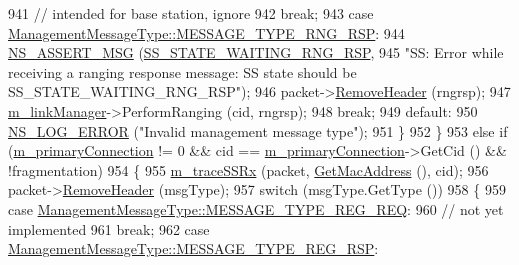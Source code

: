 \begin{DoxyCode}
941               \textcolor{comment}{// intended for base station, ignore}
942               \textcolor{keywordflow}{break};
943             \textcolor{keywordflow}{case} \hyperlink{classns3_1_1ManagementMessageType_a0e0c7a1e263538f0379d1bdb015abe3dacc6d687507c639e29ca78b926d6345e1}{ManagementMessageType::MESSAGE\_TYPE\_RNG\_RSP}:
944               \hyperlink{assert_8h_aff5ece9066c74e681e74999856f08539}{NS\_ASSERT\_MSG} (\hyperlink{classns3_1_1SubscriberStationNetDevice_af9f145bc05df1f18610a3d4b61ff9ee4acb68c803df0eb6a0f4cc41389f981db8}{SS\_STATE\_WAITING\_RNG\_RSP},
945                              \textcolor{stringliteral}{"SS: Error while receiving a ranging response message: SS state should be
       SS\_STATE\_WAITING\_RNG\_RSP"});
946               packet->\hyperlink{classns3_1_1Packet_a0961eccf975d75f902d40956c93ba63e}{RemoveHeader} (rngrsp);
947               \hyperlink{classns3_1_1SubscriberStationNetDevice_a24e7df59fb312c196318f0366b63c6e6}{m\_linkManager}->PerformRanging (cid, rngrsp);
948               \textcolor{keywordflow}{break};
949             \textcolor{keywordflow}{default}:
950               \hyperlink{group__logging_ga0261a8db1d4ac5f79417d117634fd455}{NS\_LOG\_ERROR} (\textcolor{stringliteral}{"Invalid management message type"});
951             \}
952         \}
953       \textcolor{keywordflow}{else} \textcolor{keywordflow}{if} (\hyperlink{classns3_1_1SubscriberStationNetDevice_a269b0f9be1f02abe86f5a08cf9def186}{m\_primaryConnection} != 0 && cid == 
      \hyperlink{classns3_1_1SubscriberStationNetDevice_a269b0f9be1f02abe86f5a08cf9def186}{m\_primaryConnection}->GetCid () && !fragmentation)
954         \{
955           \hyperlink{classns3_1_1SubscriberStationNetDevice_aa1771f784eeb694c5ad2035f97ee52e5}{m\_traceSSRx} (packet, \hyperlink{classns3_1_1WimaxNetDevice_aa02eb7f6de9c03f0b8f2e33e3c5b5559}{GetMacAddress} (), cid);
956           packet->\hyperlink{classns3_1_1Packet_a0961eccf975d75f902d40956c93ba63e}{RemoveHeader} (msgType);
957           \textcolor{keywordflow}{switch} (msgType.GetType ())
958             \{
959             \textcolor{keywordflow}{case} \hyperlink{classns3_1_1ManagementMessageType_a0e0c7a1e263538f0379d1bdb015abe3da828d55fda1b247a375efce7eec6f9539}{ManagementMessageType::MESSAGE\_TYPE\_REG\_REQ}:
960               \textcolor{comment}{// not yet implemented}
961               \textcolor{keywordflow}{break};
962             \textcolor{keywordflow}{case} \hyperlink{classns3_1_1ManagementMessageType_a0e0c7a1e263538f0379d1bdb015abe3da5579f363a6f117d318768de1f8e69e6f}{ManagementMessageType::MESSAGE\_TYPE\_REG\_RSP}:

\end{DoxyCode}

